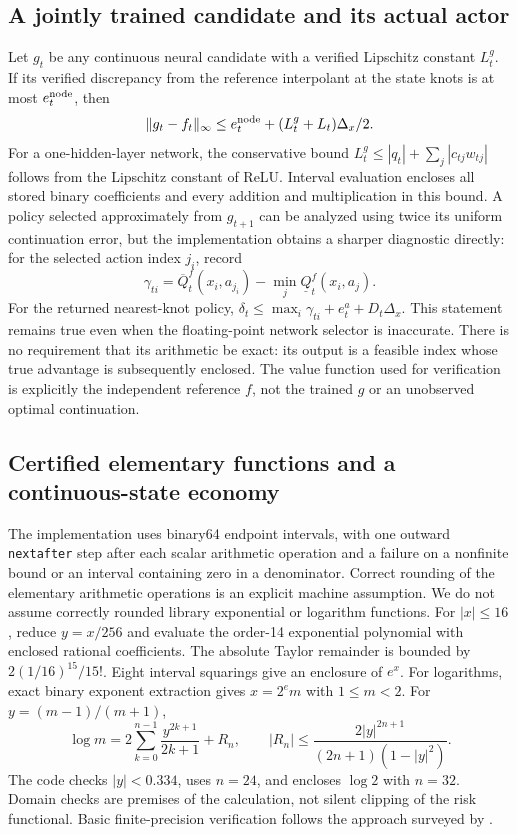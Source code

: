 \subsection{A jointly trained candidate and its actual actor}
Let $g_t$ be any continuous neural candidate with a verified Lipschitz
constant $L_t^g$. If its verified discrepancy from the reference interpolant
at the state knots is at most $e_t^{\rm node}$, then
\begin{equation}\label{eq:r38netbound}
 \|g_t-f_t\|_\infty\leq e_t^{\rm node}
                 +(L_t^g+L_t)\Delta_x/2.
\end{equation}
For a one-hidden-layer network, the conservative bound
$L_t^g\leq|q_t|+\sum_j|c_{tj}w_{tj}|$ follows from the Lipschitz constant of
ReLU. Interval evaluation encloses all stored binary coefficients and every
addition and multiplication in this bound. A policy selected approximately
from $g_{t+1}$ can be analyzed using twice its uniform continuation error,
but the implementation obtains a sharper diagnostic directly: for the
selected action index $j_i$, record
\[
 \gamma_{ti}=\overline Q_t^f(x_i,a_{j_i})-
                    \min_j\underline Q_t^f(x_i,a_j).
\]
For the returned nearest-knot policy,
$\delta_t\leq\max_i\gamma_{ti}+e_t^a+D_t\Delta_x$. This statement remains
true even when the floating-point network selector is inaccurate. There is
no requirement that its arithmetic be exact: its output is a feasible
index whose true advantage is subsequently enclosed. The value function
used for verification is explicitly the independent reference $f$, not the
trained $g$ or an unobserved optimal continuation.

\subsection{Certified elementary functions and a continuous-state economy}
The implementation uses binary64 endpoint intervals, with one outward
\texttt{nextafter} step after each scalar arithmetic operation and a failure
on a nonfinite bound or an interval containing zero in a denominator.
Correct rounding of the elementary arithmetic operations is an explicit
machine assumption. We do not assume correctly rounded library exponential
or logarithm functions. For $|x|\leq16$, reduce $y=x/256$ and evaluate the
order-14 exponential polynomial with enclosed rational coefficients. The
absolute Taylor remainder is bounded by
$2(1/16)^{15}/15!$. Eight interval squarings give an enclosure of $e^x$.
For logarithms, exact binary exponent extraction gives $x=2^e m$ with
$1\leq m<2$. For $y=(m-1)/(m+1)$,
\[
 \log m=2\sum_{k=0}^{n-1}\frac{y^{2k+1}}{2k+1}+R_n,
 \qquad |R_n|\leq
 \frac{2|y|^{2n+1}}{(2n+1)(1-|y|^2)}.
\]
The code checks $|y|<0.334$, uses $n=24$, and encloses $\log2$ with $n=32$.
Domain checks are premises of the calculation, not silent clipping of the
risk functional. Basic finite-precision verification follows the approach
surveyed by \citet{r38rump2010}.


